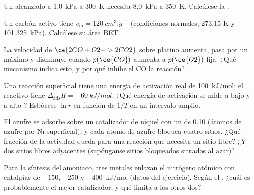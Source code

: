 \begin{exercise}[$\star\star$]\label{exo:b3:surfaces-catalysis:7}
Un  alcanzado a \qty{1.0}{kPa} a \qty{300}{K} necesita \qty{8.0}{kPa} a \qty{350}{K}. Calcúlese la .
\end{exercise}

\begin{exercise}[$\star\star$]\label{exo:b3:surfaces-catalysis:8}
Un carbón activo tiene $v_{\mathrm m} = \qty{120}{cm^3.g^{-1}}$ (condiciones normales, 273.15 K y
\qty{101.325}{kPa}). Calcúlese su área BET.
\end{exercise}

\begin{exercise}[$\star\star$]\label{exo:b3:surfaces-catalysis:9}
La velocidad de $\ce{2 CO + O2 -> 2 CO2}$ sobre platino aumenta, pasa por un máximo y disminuye cuando $p(\ce{CO})$
aumenta a $p(\ce{O2})$ fija. ¿Qué mecanismo indica esto, y por qué inhibe el CO
la reacción?
\end{exercise}

\begin{exercise}[$\star\star\star$]\label{exo:b3:surfaces-catalysis:10}
Una reacción superficial tiene una energía de activación real de \qty{100}{kJ/mol}; el reactivo tiene
$\Delta_{\mathrm{ads}}H = \qty{-60}{kJ/mol}$. ¿Qué energía de activación se mide a bajo y a alto
? Esbócese $\ln r$ en función de $1/T$ en un intervalo amplio.
\end{exercise}

\begin{exercise}[$\star\star\star$]\label{exo:b3:surfaces-catalysis:11}
El azufre se adsorbe sobre un catalizador de níquel con un  de 0.10 (átomos de azufre por
Ni superficial), y cada átomo de azufre bloquea cuatro sitios. ¿Qué fracción de la actividad
queda para una reacción que necesita un sitio libre? ¿Y dos sitios libres adyacentes (supónganse
sitios bloqueados situados al azar)?
\end{exercise}

\begin{exercise}[$\star\star\star$]\label{exo:b3:surfaces-catalysis:12}
Para la síntesis del amoniaco, tres metales enlazan el nitrógeno atómico con entalpías de
$-150$, $-250$ y \qty{-400}{kJ/mol} (datos del ejercicio). Según el , ¿cuál es probablemente el mejor catalizador, y qué limita a los otros dos?
\end{exercise}

